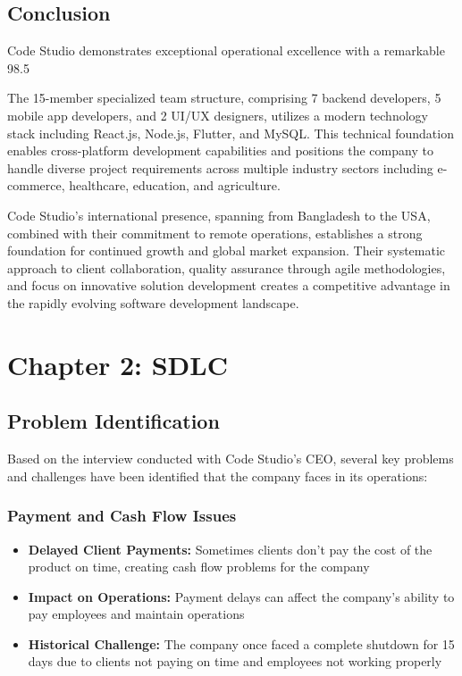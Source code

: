 \documentclass[12pt,a4paper]{article}
\begin{document}
\subsection{Conclusion}

Code Studio demonstrates exceptional operational excellence with a remarkable 98.5%

The 15-member specialized team structure, comprising 7 backend developers, 5 mobile app developers, and 2 UI/UX designers, utilizes a modern technology stack including React.js, Node.js, Flutter, and MySQL. This technical foundation enables cross-platform development capabilities and positions the company to handle diverse project requirements across multiple industry sectors including e-commerce, healthcare, education, and agriculture.

Code Studio's international presence, spanning from Bangladesh to the USA, combined with their commitment to remote operations, establishes a strong foundation for continued growth and global market expansion. Their systematic approach to client collaboration, quality assurance through agile methodologies, and focus on innovative solution development creates a competitive advantage in the rapidly evolving software development landscape.


\newpage
\pagestyle{chapter2style}

\section{Chapter 2: SDLC}


\subsection{Problem Identification}
Based on the interview conducted with Code Studio's CEO, several key problems and challenges have been identified that the company faces in its operations:

\subsubsection{Payment and Cash Flow Issues}
\begin{itemize}
    \item \textbf{Delayed Client Payments:} Sometimes clients don't pay the cost of the product on time, creating cash flow problems for the company
    \item \textbf{Impact on Operations:} Payment delays can affect the company's ability to pay employees and maintain operations
    \item \textbf{Historical Challenge:} The company once faced a complete shutdown for 15 days due to clients not paying on time and employees not working properly
\end{itemize}
\end{document}
